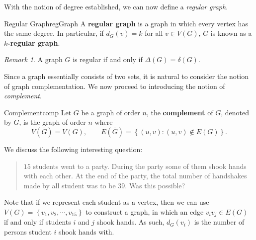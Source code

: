 \documentclass[math, code]{amznotes}
\theoremstyle{remark}
\newtheorem*{remark}{Remark}
\begin{document}
With the notion of degree established, we can now define a \textit{regular graph}.
\begin{dfnbox}{Regular Graph}{regGraph}
    A {\color{red} \textbf{regular graph}} is a graph in which every vertex has the same degree. In particular, if $d_G(v) = k$ for all $v \in V(G)$, $G$ is known as a {\color{red} \textbf{$k$-regular graph}}.
\end{dfnbox}
\begin{notebox}
    \begin{remark}
        A graph $G$ is regular if and only if $\Delta(G) = \delta(G)$.
    \end{remark}
\end{notebox}
Since a graph essentially consists of two sets, it is natural to consider the notion of graph complementation. We now proceed to introducing the notion of \textit{complement}.
\begin{dfnbox}{Complement}{comp}
    Let $G$ be a graph of order $n$, the {\color{red} \textbf{complement}} of $G$, denoted by $\overline{G}$, is the graph of order $n$ where
    \begin{equation*}
        V\left(\overline{G}\right) = V(G), \qquad E\left(\overline{G}\right) = \left\{(u, v) \colon (u, v) \notin E(G)\right\}.
    \end{equation*}
\end{dfnbox}
We discuss the following interesting question:
\begin{quote}
    $15$ students went to a party. During the party some of them shook hands with each other. At the end of the party, the total number of handshakes made by all student was to be $39$. Was this possible?
\end{quote}
Note that if we represent each student as a vertex, then we can use $V(G) = \left\{v_1, v_2, \cdots, v_{15}\right\}$ to construct a graph, in which an edge $v_iv_j \in E(G)$ if and only if students $i$ and $j$ shook hands. As such, $d_G(v_i)$ is the number of persons student $i$ shook hands with.
\end{document}
